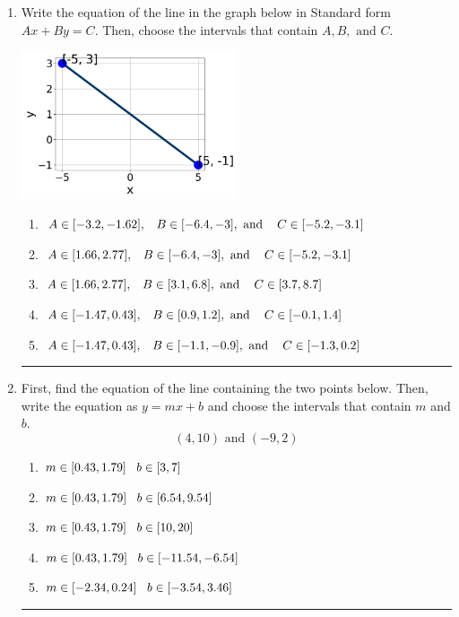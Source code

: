 \documentclass[14pt]{extbook}
\newcommand{\litem}[1]{\item#1\hspace*{-1cm}\rule{\textwidth}{0.4pt}}
\begin{document}
\begin{enumerate}
{\begin{enumerate}[label=\Alph*.]
\end{enumerate} }
\litem{
Write the equation of the line in the graph below in Standard form $Ax+By=C$. Then, choose the intervals that contain $A, B, \text{ and } C$.
\begin{center}
    \includegraphics[width=0.5\textwidth]{../Figures/linearGraphToStandardC.png}
\end{center}
\begin{enumerate}[label=\Alph*.]
\item \( A \in [-3.2, -1.62], \hspace{3mm} B \in [-6.4, -3], \text{ and } \hspace{3mm} C \in [-5.2, -3.1] \)
\item \( A \in [1.66, 2.77], \hspace{3mm} B \in [-6.4, -3], \text{ and } \hspace{3mm} C \in [-5.2, -3.1] \)
\item \( A \in [1.66, 2.77], \hspace{3mm} B \in [3.1, 6.8], \text{ and } \hspace{3mm} C \in [3.7, 8.7] \)
\item \( A \in [-1.47, 0.43], \hspace{3mm} B \in [0.9, 1.2], \text{ and } \hspace{3mm} C \in [-0.1, 1.4] \)
\item \( A \in [-1.47, 0.43], \hspace{3mm} B \in [-1.1, -0.9], \text{ and } \hspace{3mm} C \in [-1.3, 0.2] \)

\end{enumerate} }
\litem{
First, find the equation of the line containing the two points below. Then, write the equation as $ y=mx+b $ and choose the intervals that contain $m$ and $b$.\[ (4, 10) \text{ and } (-9, 2) \]\begin{enumerate}[label=\Alph*.]
\item \( m \in [0.43, 1.79] \hspace*{3mm} b \in [3, 7] \)
\item \( m \in [0.43, 1.79] \hspace*{3mm} b \in [6.54, 9.54] \)
\item \( m \in [0.43, 1.79] \hspace*{3mm} b \in [10, 20] \)
\item \( m \in [0.43, 1.79] \hspace*{3mm} b \in [-11.54, -6.54] \)
\item \( m \in [-2.34, 0.24] \hspace*{3mm} b \in [-3.54, 3.46] \)


\end{enumerate}}
\end{enumerate}
\end{document}
